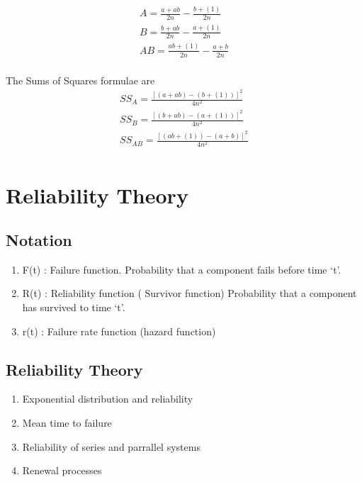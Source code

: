 \begin{eqnarray}
A = \frac{a+ab}{2n} -  \frac{b + (1)}{2n}\\
B = \frac{b+ab}{2n} -  \frac{a + (1)}{2n}\\
AB = \frac{ab + (1)}{2n} -  \frac{a + b}{2n}\\
\end{eqnarray}

The Sums of Squares formulae are
\begin{eqnarray}
SS_{A} = \frac{[(a + ab)-(b + (1))]^2}{4n^2}\\
SS_{B} = \frac{[(b + ab)-(a + (1))]^2}{4n^2}\\
SS_{AB} = \frac{[(ab + (1))-(a + b)]^2}{4n^2}\\
\end{eqnarray}







\chapter{Reliability Theory}

\section{Notation}\begin{enumerate}
	\item
	F(t) : Failure function. Probability that a component fails
	before time `t'.
	\item R(t) : Reliability function ( Survivor function) Probability that a component
	has survived to time `t'.
	\item r(t) : Failure rate function (hazard function)
\end{enumerate}

\section{Reliability Theory}

\begin{enumerate}
	\item Exponential distribution and reliability\item Mean time to
	failure \item Reliability of series and parrallel systems \item
	Renewal processes\end{enumerate}
\newpage
